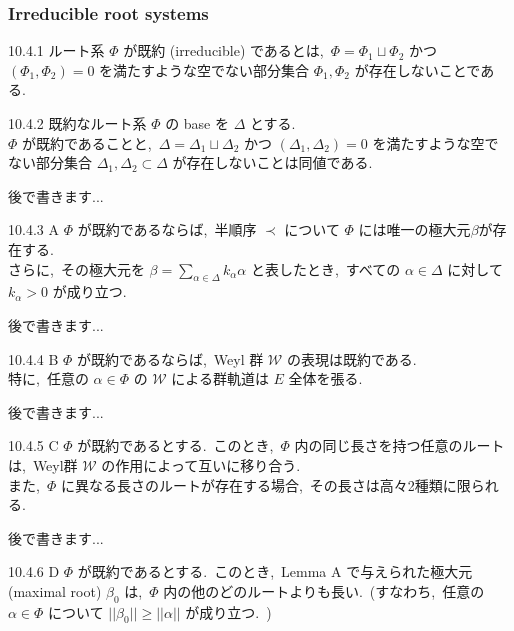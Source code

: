 \documentclass[uplatex,dvipdfmx]{jsarticle}
\begin{document}
\subsubsection{Irreducible root systems}
\begin{mydef}{10.4.1}
    ルート系 $\Phi$ が既約 (irreducible) であるとは,~$\Phi = \Phi_1 \sqcup \Phi_2$ かつ $(\Phi_1, \Phi_2) = 0$ を満たすような空でない部分集合 $\Phi_1, \Phi_2$ が存在しないことである.~
\end{mydef}
\begin{mythm}{10.4.2}
    既約なルート系 $\Phi$ の base を $\Delta$ とする.~\\
    $\Phi$ が既約であることと,~$\Delta = \Delta_1 \sqcup \Delta_2$ かつ $(\Delta_1, \Delta_2) = 0$ を満たすような空でない部分集合 $\Delta_1, \Delta_2 \subset \Delta$ が存在しないことは同値である.~
\end{mythm}
\begin{myproof}
    後で書きます...
\end{myproof}
\begin{mylemma}{10.4.3 A}
    $\Phi$ が既約であるならば,~半順序 $\prec$ について $\Phi$ には唯一の極大元$\beta$が存在する.~\\
    さらに,~その極大元を $\beta = \sum_{\alpha \in \Delta} k_\alpha \alpha$ と表したとき,~すべての $\alpha \in \Delta$ に対して $k_\alpha > 0$ が成り立つ.~
\end{mylemma}
\begin{myproof}
    後で書きます...
\end{myproof}
\begin{mylemma}{10.4.4 B}
    $\Phi$ が既約であるならば,~Weyl 群 $\mathcal{W}$ の表現は既約である.\\
    特に,~任意の $\alpha \in \Phi$ の $\mathcal{W}$ による群軌道は $E$ 全体を張る.~
\end{mylemma}
\begin{myproof}
    後で書きます...
\end{myproof}
\begin{mylemma}{10.4.5 C}
    $\Phi$ が既約であるとする.~このとき,~$\Phi$ 内の同じ長さを持つ任意のルートは,~Weyl群 $\mathcal{W}$ の作用によって互いに移り合う.~\\
    また,~$\Phi$ に異なる長さのルートが存在する場合,~その長さは高々2種類に限られる.
\end{mylemma}
\begin{myproof}
    後で書きます...
\end{myproof}
\begin{mylemma}{10.4.6 D}
    $\Phi$ が既約であるとする.~このとき,~Lemma A で与えられた極大元 (maximal root) $\beta_0$ は,~$\Phi$ 内の他のどのルートよりも長い.~(すなわち,~任意の $\alpha \in \Phi$ について $||\beta_0|| \ge ||\alpha||$ が成り立つ.~)
\end{mylemma}
\end{document}
